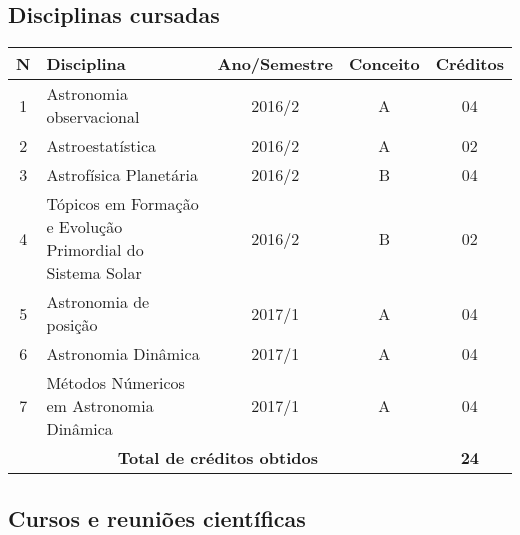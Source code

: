 \documentclass[a4paper, 11pt]{article}
\begin{document}
\subsection{Disciplinas cursadas}

\begin{center}
\begin{tabular}{clccc}
\toprule
\textbf{N}&$\hspace{2cm}$\textbf{Disciplina} &\textbf{Ano/Semestre}&\textbf{Conceito}& \textbf{Cr\'editos} \\ \midrule
1 & Astronomia observacional                                             & 2016/2 & A & 04 \\ 
2 & Astroestatística                                                     & 2016/2 & A & 02 \\ 
3 & Astrofísica Planetária                                               & 2016/2 & B & 04 \\ 
4 & Tópicos em Formação e Evolução Primordial do Sistema Solar           & 2016/2 & B & 02 \\
5 & Astronomia de posição                                                & 2017/1 & A & 04 \\ 
6 & Astronomia Dinâmica                                                  & 2017/1 & A & 04 \\ 
7 & Métodos Númericos em Astronomia Dinâmica                             & 2017/1 & A & 04 \\ \midrule 
\multicolumn{4}{c}{\textbf{Total de cr\'editos obtidos}}               & \textbf{24} \\ \bottomrule
\end{tabular}
\end{center}

\subsection{Cursos e reuni\~oes cient\'ificas}
\end{document}
